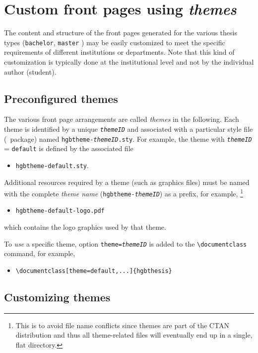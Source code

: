 \documentclass[english]{hgbarticle}
\begin{document}
\section{Custom front pages using \emph{themes}}
\label{sec:Themes}

The content and structure of the front pages generated for the various thesis types
(\texttt{bachelor}, \texttt{master} \etc) may be easily customized to meet the specific
requirements of different institutions or departments.
Note that this kind of customization is typically done at the institutional level and not
by the individual author (student).


\subsection{Preconfigured themes}

The various front page arrangements are called \emph{themes} in the following.
Each theme is identified by a unique \texttt{\textit{themeID}} and associated with a 
particular style file (\latex\ package) named 
\texttt{hgbtheme-\textit{themeID}.sty}.
For example, the theme with \texttt{\textit{themeID}} = \texttt{default} is defined 
by the associated file
\begin{itemize}
  \item[] \texttt{hgbtheme-default.sty}.
\end{itemize}
%
Additional resources required by a theme (such as graphics files) must be named with the 
complete \emph{theme name} (\texttt{hgbtheme-\textit{themeID}})
as a prefix, for example,%
\footnote{This is to avoid file name conflicts since themes are part of the 
CTAN distribution and thus all theme-related files will eventually end up in a single, 
flat directory.}
\begin{itemize}
	\item[] \texttt{hgbtheme-default-logo.pdf}
\end{itemize}
%
which contains the logo graphics used by that theme.

To \emph{use} a specific theme, option \texttt{theme=\textit{themeID}}
is added to the \verb!\documentclass! command, for example,
\begin{itemize}
	\item[] \verb!\documentclass[theme=default,...]{hgbthesis}!
\end{itemize}


\subsection{Customizing themes}
\label{sec:CustomizingThemes}
\end{document}
